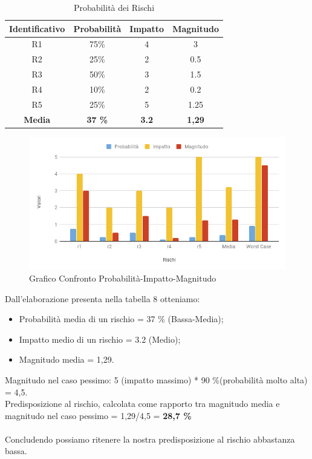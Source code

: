 	\begin{table}[!htpb]
		\centering
		\renewcommand{\arraystretch}{2} 
		\begin{tabular}{|c|c|c|c|}
		    \rowcolor{orange!50}
		    \hline
		    \textbf{Identificativo} & \textbf{Probabilità} & \textbf{Impatto} & \textbf{Magnitudo}\\
			\hline
			R1 & 75\% & 4 & 3 \\
			\hline
			R2 &  25\%  & 2  & 0.5 \\
			\hline
			R3  & 50\%  & 3  & 1.5 \\
			\hline
			R4  & 10\% &  2 &  0.2 \\
			\hline
			R5  & 25\%  & 5  & 1.25 \\
			\hline
			\textbf{Media}  & \textbf{37 \%}&  \textbf{3.2} &  \textbf{1,29}\\
			\hline
		\end{tabular}
		\caption{Probabilità dei Rischi}
	\end{table}
	\newline
	\begin{figure}
	    \centering
	    \includegraphics[scale=0.6]{elaborazione_manitudo.png} 
	    \caption{Grafico Confronto Probabilità-Impatto-Magnitudo}
	\end{figure}
	\newline
	Dall'elaborazione presenta nella tabella 8 otteniamo:
	\begin{itemize}
	    \item Probabilità media di un rischio = 37 \% (Bassa-Media);
	    \item Impatto medio di un rischio = 3.2 (Medio);
	    \item  Magnitudo media = 1,29.
	\end{itemize}
	Magnitudo nel caso pessimo: 5 (impatto massimo) * 90 \%(probabilità molto alta) = 4,5.\\
	Predisposizione al rischio, calcolata come rapporto tra magnitudo media e magnitudo nel caso pessimo = 1,29/4,5 = \textbf{ 28,7 \% }\\ \\
	Concludendo possiamo ritenere la nostra predisposizione al rischio abbastanza bassa.
